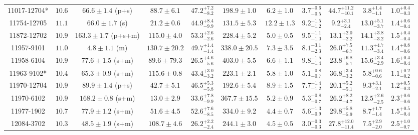 \begin{landscape}
\begin{longtable}{ccccccccccc}
11017-12704* & $10.6$  & $66.6 \pm 1.4$ (p+s)  & $88.7 \pm 6.1$ & $47.2^{+7.2}_{-8.2}$  & $198.9 \pm 1.0 $ & $6.2 \pm 1.0 $ & $3.7^{+0.6}_{-0.5}$  & $44.7^{+11.2}_{-10.1}$  & $3.8^{+1.4}_{-1.1}$  & $1.0^{+0.4}_{-0.3}$ \\ 
11754-12705 & $11.1$  & $66.0 \pm 1.7$ (s)  & $21.2 \pm 0.6$ & $44.9^{+8.4}_{-9.9}$  & $131.5 \pm 5.3 $ & $12.2 \pm 1.3 $ & $9.2^{+1.5}_{-1.2}$  & $9.2^{+3.1}_{-2.4}$  & $13.0^{+5.1}_{-3.7}$  & $1.4^{+0.6}_{-0.4}$ \\ 
11872-12702 & $10.9$  & $163.3 \pm 1.7$ (p+s+m)  & $115.0 \pm 4.0$ & $53.3^{+2.6}_{-2.6}$  & $228.4 \pm 5.2 $ & $5.0 \pm 0.5 $ & $9.5^{+1.1}_{-1.0}$  & $13.1^{+2.0}_{-2.2}$  & $14.1^{+3.8}_{-3.2}$  & $1.5^{+0.4}_{-0.4}$ \\ 
11957-9101 & $11.0$  & $4.8 \pm 1.1$ (m)  & $130.7 \pm 20.2$ & $49.7^{+1.4}_{-1.4}$  & $338.0 \pm 20.5 $ & $7.3 \pm 3.5 $ & $8.1^{+3.1}_{-2.3}$  & $26.0^{+7.5}_{-6.7}$  & $11.3^{+4.7}_{-3.4}$  & $1.4^{+0.8}_{-0.6}$ \\ 
11958-6104 & $10.9$  & $77.6 \pm 1.5$ (s+m)  & $89.6 \pm 79.3$ & $26.5^{+4.6}_{-5.6}$  & $403.0 \pm 5.5 $ & $6.6 \pm 1.1 $ & $9.8^{+1.5}_{-1.4}$  & $23.8^{+6.8}_{-5.1}$  & $15.6^{+3.4}_{-2.9}$  & $1.6^{+0.4}_{-0.4}$ \\ 
11963-9102* & $10.4$  & $65.3 \pm 0.9$ (s+m)  & $115.6 \pm 0.8$ & $43.4^{+3.0}_{-3.2}$  & $223.1 \pm 2.1 $ & $5.8 \pm 1.0 $ & $5.1^{+0.8}_{-0.7}$  & $36.8^{+3.4}_{-3.2}$  & $5.8^{+0.6}_{-0.6}$  & $1.1^{+0.2}_{-0.2}$ \\ 
11970-12704 & $10.9$  & $89.9 \pm 1.4$ (p+s)  & $42.7 \pm 5.1$ & $46.5^{+5.3}_{-5.8}$  & $192.6 \pm 5.4 $ & $8.9 \pm 1.5 $ & $7.7^{+1.4}_{-1.2}$  & $20.1^{+5.2}_{-5.1}$  & $9.3^{+3.1}_{-2.1}$  & $1.2^{+0.5}_{-0.3}$ \\ 
11970-6102 & $10.9$  & $168.2 \pm 0.8$ (s+m)  & $13.0 \pm 2.9$ & $33.6^{+7.8}_{-9.9}$  & $367.7 \pm 15.5 $ & $5.2 \pm 0.9 $ & $5.3^{+0.8}_{-0.7}$  & $26.2^{+8.2}_{-4.7}$  & $12.5^{+2.6}_{-2.5}$  & $2.3^{+0.6}_{-0.6}$ \\ 
11977-1902 & $10.7$  & $77.9 \pm 1.2$ (s+m)  & $51.6 \pm 4.5$ & $52.6^{+7.6}_{-8.5}$  & $334.0 \pm 9.2 $ & $4.4 \pm 0.7 $ & $5.6^{+1.3}_{-0.9}$  & $29.8^{+5.8}_{-5.9}$  & $8.7^{+1.7}_{-1.4}$  & $1.5^{+0.5}_{-0.4}$ \\ 
12084-3702 & $10.3$  & $48.5 \pm 1.9$ (s+m)  & $108.7 \pm 4.6$ & $26.2^{+2.2}_{-2.4}$  & $244.1 \pm 3.0 $ & $4.5 \pm 0.5 $ & $3.0^{+0.3}_{-0.3}$  & $27.8^{+12.0}_{-11.4}$  & $7.5^{+2.9}_{-2.0}$  & $2.5^{+1.0}_{-0.7}$ \\ 

\end{longtable}
\end{landscape}
